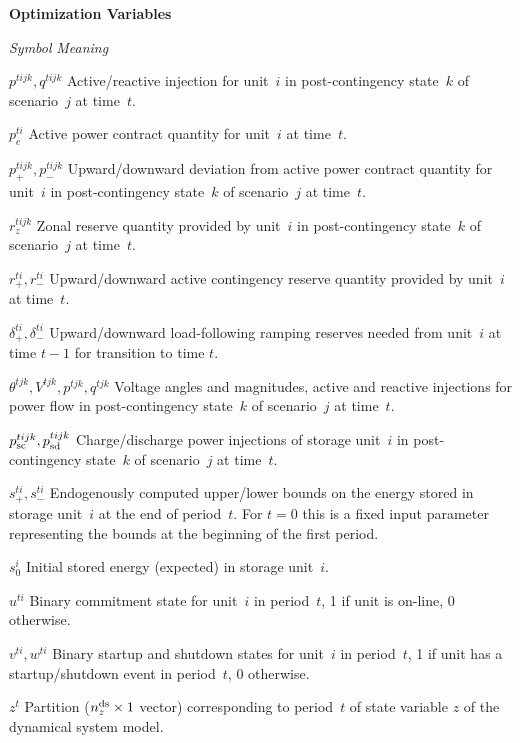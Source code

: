 \documentclass[12pt]{article}
\newcommand{\namelistlabel}[1]{\mbox{#1}\hfil}
\newenvironment{namelist}[1]{%
\begin{list}{}
  {
    \let\makelabel\namelistlabel
    \settowidth{\labelwidth}{#1}
    \setlength{\leftmargin}{1.1\labelwidth}
  }
 }{%
\end{list}}
\numberwithin{equation}{section}
\numberwithin{table}{section}
\numberwithin{figure}{section}
\begin{document}
\begin{namelist}{XXXXXXXXXX}
\item[]
\item[{\bf Optimization Variables}]
\item[\emph{Symbol}] \emph{Meaning}
\item[$p^{tijk}, q^{tijk}$] Active/reactive injection for unit~$i$ in post-contingency state~$k$ of scenario~$j$ at time~$t$.
\item[$p_c^{ti}$] Active power contract quantity for unit~$i$ at time~$t$.
\item[$p_+^{tijk}, p_-^{tijk}$] Upward/downward deviation from active power contract quantity for unit~$i$ in post-contingency state~$k$ of scenario~$j$ at time~$t$.
\item[$r_z^{tijk}$] Zonal reserve quantity provided by unit~$i$ in post-contingency state~$k$ of scenario~$j$ at time~$t$.
\item[$r_+^{ti}, r_-^{ti}$] Upward/downward active contingency reserve quantity provided by unit~$i$ at time~$t$.
\item[$\delta_+^{ti}, \delta_-^{ti}$] Upward/downward load-following ramping reserves needed from unit~$i$ at time $t-1$ for transition to time $t$.
\item[$\theta^{tjk}, V^{tjk}, p^{tjk}, q^{tjk}$] Voltage angles and magnitudes, active and reactive injections for power flow in post-contingency state~$k$ of scenario~$j$ at time~$t$.
\item[$p_{\rm sc}^{tijk}, p_{\rm sd}^{tijk}$] Charge/discharge power injections of storage unit~$i$ in post-contingency state~$k$ of scenario~$j$ at time~$t$.
\item[$s_+^{ti}, s_-^{ti}$] Endogenously computed upper/lower bounds on the energy stored in storage unit~$i$ at the end of period~$t$. For $t = 0$ this is a fixed input parameter representing the bounds at the beginning of the first period.
\item[$s_0^i$] Initial stored energy (expected) in storage unit~$i$.
\item[$u^{ti}$] Binary commitment state for unit~$i$ in period~$t$, 1 if unit is on-line, 0 otherwise.
\item[$v^{ti}, w^{ti}$] Binary startup and shutdown states for unit~$i$ in period~$t$, 1 if unit has a startup/shutdown event in period~$t$, 0 otherwise.
\item[$z^t$] Partition ($n_z^{\rm ds} \times 1$ vector) corresponding to period~$t$ of state variable $z$ of the dynamical system model.


\end{namelist}
\end{document}
